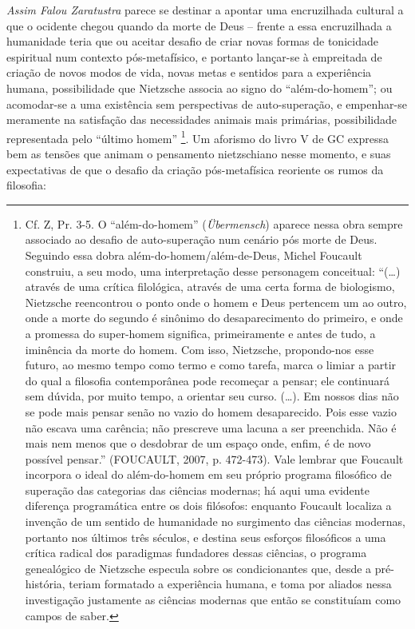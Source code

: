 \documentclass[
	12pt,				%
	openright,			%
	oneside,			%
	a4paper,			%
	english,			%
	french,				%
	spanish,			%
	brazil				%
	]{abntex2}
\begin{document}
\textit{Assim Falou Zaratustra} parece se destinar a apontar uma encruzilhada cultural a que o ocidente chegou quando da morte de Deus – frente a essa encruzilhada a humanidade teria que ou aceitar desafio de criar novas formas de tonicidade espiritual num contexto pós-metafísico, e portanto lançar-se à empreitada de criação de novos modos de vida, novas metas e sentidos para a experiência humana, possibilidade que Nietzsche associa ao signo do “além-do-homem”; ou acomodar-se a uma existência sem perspectivas de auto-superação, e empenhar-se meramente na satisfação das necessidades animais mais primárias, possibilidade representada pelo “último homem”
\footnote{Cf. Z, Pr. 3-5. O “além-do-homem” (\textit{Übermensch}) aparece nessa obra sempre associado ao desafio de auto-superação num cenário pós morte de Deus. Seguindo essa dobra além-do-homem/além-de-Deus, Michel Foucault construiu, a seu modo, uma interpretação desse personagem conceitual: “(…) através de uma crítica filológica, através de uma certa forma de biologismo, Nietzsche reencontrou o ponto onde o homem e Deus pertencem um ao outro, onde a morte do segundo é sinônimo do desaparecimento do primeiro, e onde a promessa do super-homem significa, primeiramente e antes de tudo, a iminência da  morte do homem. Com isso, Nietzsche, propondo-nos esse futuro, ao mesmo tempo como termo e como tarefa, marca o limiar a partir do qual a filosofia contemporânea pode recomeçar a pensar; ele continuará sem dúvida, por muito tempo, a orientar seu curso. (…). Em nossos dias não se pode mais pensar senão no vazio do homem desaparecido. Pois esse vazio não escava uma carência; não prescreve uma lacuna a ser preenchida. Não é mais nem menos que o desdobrar de um espaço onde, enfim, é de novo possível pensar.” (FOUCAULT, 2007, p. 472-473). Vale lembrar que Foucault incorpora o ideal do além-do-homem em seu próprio programa filosófico de superação das categorias das ciências modernas; há aqui uma evidente diferença programática entre os dois filósofos: enquanto Foucault localiza a invenção de um sentido de humanidade no surgimento das ciências modernas, portanto nos últimos três séculos, e destina seus esforços filosóficos a uma crítica radical dos paradigmas fundadores dessas ciências, o programa genealógico de Nietzsche especula sobre os condicionantes que, desde a pré-história, teriam formatado a experiência humana, e toma por aliados nessa investigação justamente as ciências modernas que então se constituíam como campos de saber.}. Um aforismo do livro V de GC expressa bem as tensões que animam o pensamento nietzschiano nesse momento, e suas expectativas de que o desafio da criação pós-metafísica reoriente os rumos da filosofia:
\end{document}
